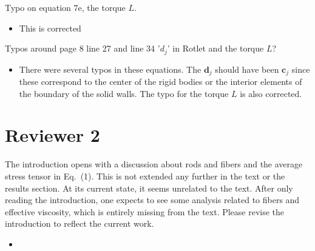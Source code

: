 \documentclass[11pt]{article}
\newcommand{\comment}[1]{{\color{blue} #1}}
\begin{document}
\noindent
\comment{Typo on equation 7e, the torque $L$.}
\begin{itemize}
  \item This is corrected
\end{itemize}

\noindent
\comment{Typos around page 8 line 27 and line 34 '$d_j$' in Rotlet and the
torque $L$?}
\begin{itemize}
  \item There were several typos in these equations.  The $\mathbf{d}_j$
    should have been $\mathbf{c}_j$ since these correspond to the center
    of the rigid bodies or the interior elements of the boundary of the
    solid walls.  The typo for the torque $L$ is also corrected.
\end{itemize}


\section*{Reviewer 2}
\noindent
\comment{The introduction opens with a discussion about rods and fibers
  and the average stress tensor in Eq.~(1). This is not extended any
  further in the text or the results section. At its current state, it
  seems unrelated to the text. After only reading the introduction, one
  expects to see some analysis related to fibers and effective
viscosity, which is entirely missing from the text. Please revise the
introduction to reflect the current work.}
\begin{itemize}
  \item {}
\end{itemize}
\end{document}
